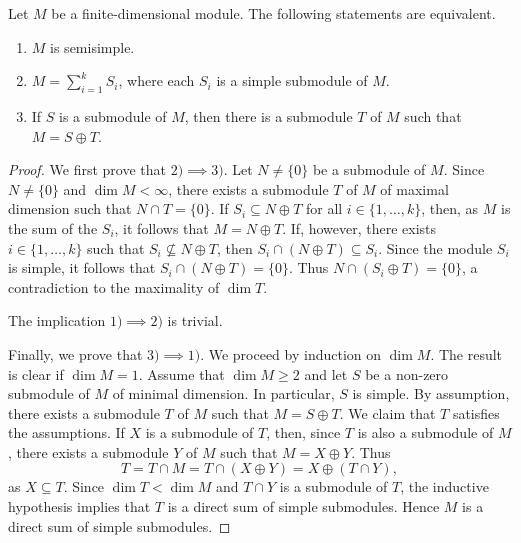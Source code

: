 \begin{proposition}
\label{pro:semisimple}
	Let $M$ be a finite-dimensional module. The following statements are equivalent.
	\begin{enumerate}
		\item $M$ is semisimple.
		\item $M=\sum_{i=1}^k S_i$, where each $S_i$ is a simple submodule of $M$. 
		\item If $S$ is a submodule of $M$, then there is a submodule $T$ of $M$ such that $M=S\oplus T$.    
	\end{enumerate}
\end{proposition}

\begin{proof}
	We first prove that $2)\implies3)$.
	Let $N\ne\{0\}$ be a submodule of $M$. Since $N\ne\{0\}$ and $\dim M<\infty$, there exists a submodule 
	$T$ of $M$ of maximal dimension such that 
	$N\cap T=\{0\}$. If $S_i\subseteq N\oplus T$ for all $i\in\{1,\dots,k\}$, then, as $M$ is the sum of the $S_i$, it follows that
	$M=N\oplus T$. 
	If, however, there exists $i\in\{1,\dots,k\}$ such that $S_i\not\subseteq N\oplus T$, then $S_i\cap (N\oplus T)\subseteq S_i$. 
	Since the module $S_i$ is simple,
	it follows that $S_i\cap (N\oplus T)=\{0\}$. Thus $N\cap (S_i\oplus T)=\{0\}$, a contradiction to the maximality of
	$\dim T$.  
	
	The implication  $1)\implies2)$ is trivial. 
	
	Finally, we prove that $3)\implies1)$. 
	We proceed by induction on $\dim M$. The result is clear if $\dim M=1$. Assume that $\dim M\geq2$ and   
	let $S$ be a non-zero submodule of $M$ of minimal dimension. In particular, $S$ is simple. 
    By assumption, there exists a submodule $T$ of $M$ such that $M=S\oplus T$. We claim that $T$ satisfies the assumptions. 
	If $X$ is a submodule of $T$, then, since $T$ is also a submodule of $M$, there exists a submodule $Y$ of $M$ such that 
	$M=X\oplus Y$. Thus  
	\[
	T=T\cap M=T\cap (X\oplus Y)=X\oplus (T\cap Y),
	\]
	as $X\subseteq T$. 
	Since $\dim T<\dim M$ and $T\cap Y$ is a submodule of $T$, the inductive hypothesis implies 
	that $T$ is a direct sum of simple submodules. Hence $M$ is a direct sum of simple submodules. 
\end{proof}


